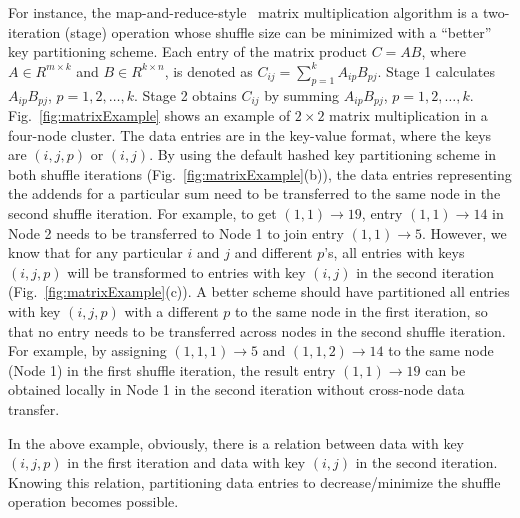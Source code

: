 \documentclass[10pt,journal,compsoc]{IEEEtran}
\begin{document}
For instance, the map-and-reduce-style~\cite{dean2008mapreduce} matrix multiplication algorithm is a two-iteration
(stage) operation whose shuffle size can be minimized with a ``better''
key partitioning scheme.
Each entry of the matrix product $C=AB$, where $A \in R^{m \times k}$ and $B \in R^{k \times n}$, is denoted as $C_{ij}=\sum_{p=1}^k A_{ip}B_{pj}$. 
Stage 1 calculates $A_{ip}B_{pj}$, $p=1, 2, \ldots, k$. 
Stage 2 obtains $C_{ij}$ by summing $A_{ip}B_{pj}$, $p=1, 2, \ldots, k$.
Fig.~\ref{fig:matrixExample} shows an example of $2 \times 2$ matrix multiplication in a four-node cluster. 
The data entries are in the key-value format, where the keys are $(i,j,p)$ or $(i,j)$. 
By using the default hashed key partitioning scheme in both shuffle iterations
(Fig.~\ref{fig:matrixExample}(b)), the data entries representing the addends
for a particular sum need to be transferred to the same node in the
second shuffle iteration. %
For example, to get $(1,1) \rightarrow 19$, entry $(1,1)\rightarrow 14$ in Node 2 needs to be transferred to Node 1 to join entry $(1,1) \rightarrow 5$.
However, we know that for any particular $i$ and $j$ and different $p$'s, all entries with keys $(i,j,p)$ will be transformed to 
entries with key $(i,j)$ in
the second iteration (Fig.~\ref{fig:matrixExample}(c)).
A better scheme should have partitioned all entries with key $(i,j,p)$
with a different $p$ to the same node in the first iteration, so that 
no entry needs to be transferred across nodes in the second shuffle
iteration.
For example, by assigning $(1,1,1)\rightarrow 5$ and $(1,1,2)
\rightarrow 14$ to the same node (Node 1) in the first shuffle iteration,
the result entry $(1,1) \rightarrow 19$ can be obtained locally 
in Node 1 in the second iteration without cross-node data transfer.

In the above example, obviously, there is a relation between data with
key $(i,j,p)$ in the first iteration and data with key $(i,j)$ in the second iteration.
Knowing this relation, partitioning data entries 
to decrease/minimize the shuffle operation becomes possible.
\end{document}
